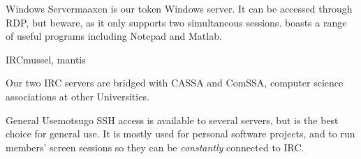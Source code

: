 \begin{uccservice}{Windows Server}{maaxen}
 is our token Windows server. It can be accessed through RDP, but beware, as it only supports two simultaneous sessions.  boasts a range of useful programs including Notepad and Matlab.
\end{uccservice}

\begin{uccservice}{IRC}{mussel, mantis}

Our two IRC servers are bridged with CASSA and ComSSA, computer science associations at other Universities.
\end{uccservice}

\begin{uccservice}{General Use}{motsugo}
SSH access is available to several servers, but  is the best choice for general use. It is mostly used for personal software projects, and to run members' screen sessions so they can be \emph{constantly} connected to IRC.
\end{uccservice}